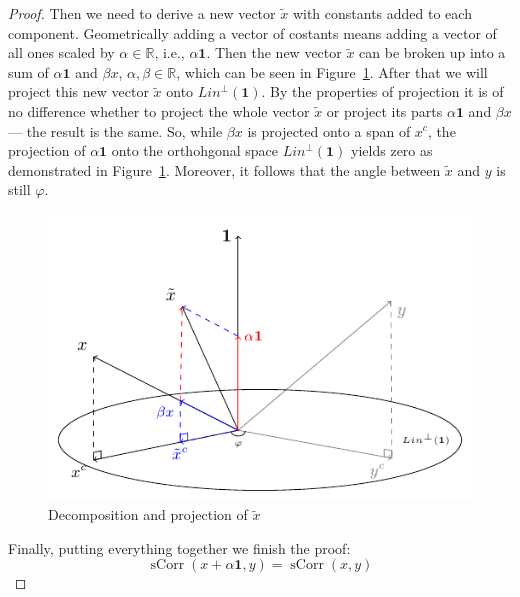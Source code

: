 \documentclass[nobib]{tufte-handout}
\DeclareMathOperator{\sCorr}{sCorr}
\begin{document}
\begin{proof}
Then we need to derive a new vector $\tilde x$ with constants added to each component.
Geometrically adding a vector of costants means adding a vector of all ones scaled by $\alpha \in \mathbb{R}$, i.e., $\alpha \mathbf{1}$.
Then the new vector $\tilde x$ can be broken up into a sum of $\alpha \mathbf{1}$ and $\beta x$, $\alpha, \beta \in \mathbb{R}$, which can be seen in Figure~\ref{fig:corr_tildex}.
After that we will project this new vector $\tilde x$ onto $Lin^{\perp}(\mathbf{1})$.
By the properties of projection it is of no difference whether to project the whole vector $\tilde x$ or project its parts $\alpha \mathbf{1}$ and $\beta x$ — the result is the same.
So, while $\beta x$ is projected onto a span of $x^c$, the projection of $\alpha \mathbf{1}$ onto the orthohgonal space $Lin^{\perp}(\mathbf{1})$ yields zero as demonstrated in Figure~\ref{fig:corr_tildex}.
Moreover, it follows that the angle between $\tilde x$ and $y$ is still $\varphi$.

\begin{figure}
  \centering
  \includegraphics{images/corr_const_br_up.pdf}
  \caption{Decomposition and projection of $\tilde x$}
  \label{fig:corr_tildex}
\end{figure}

Finally, putting everything together we finish the proof:
\[
\sCorr(x + \alpha \mathbf{1}, y) = \sCorr(x,y)
\]


\end{proof}
\end{document}

